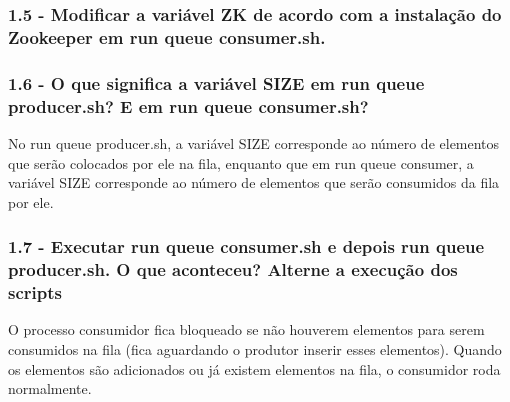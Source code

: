 \vspace{-0.5em}
\begin{minipage}{\textwidth}
  \hspace{-1em}
  \centering
  
  \label{prog1}
  \hspace{1em}
\end{minipage}
\vspace{0.5em}

\subsubsection{1.5 - Modificar a variável ZK de acordo com a instalação do Zookeeper em run queue consumer.sh.}

\vspace{-0.5em}
\begin{minipage}{\textwidth}
  \hspace{-1em}
  \centering
  
  \label{prog1}
  \hspace{1em}
\end{minipage}
\vspace{0.5em}

\subsubsection{1.6 - O que significa a variável SIZE em run queue producer.sh? E em
run queue consumer.sh?}
No run queue producer.sh, a variável SIZE corresponde ao número de elementos que serão colocados por ele na fila, enquanto que em run queue consumer, a variável SIZE corresponde ao número de elementos que serão consumidos da fila por ele.


\subsubsection{1.7 - Executar run queue consumer.sh e depois run queue producer.sh.
O que aconteceu? Alterne a execução dos scripts}

O processo consumidor fica bloqueado se não houverem elementos para serem consumidos na fila (fica aguardando o produtor inserir esses elementos). Quando os elementos são adicionados ou já existem elementos na fila, o consumidor roda normalmente.\newline


